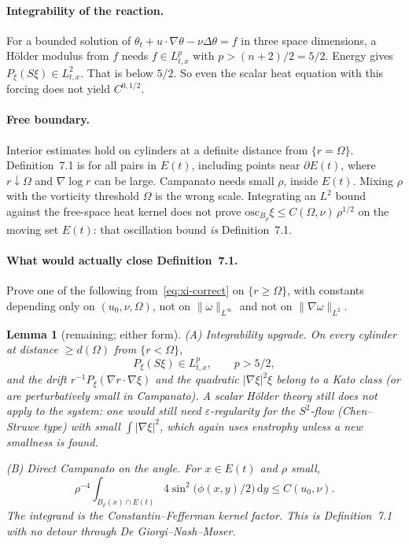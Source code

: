 \documentclass[11pt,a4paper]{article}
\newtheorem{lemma}{Lemma}
\theoremstyle{definition}
\theoremstyle{remark}
\newcommand{\abs}[1]{\lvert#1\rvert}
\newcommand{\norm}[1]{\lVert#1\rVert}
\newcommand{\dd}{\mathrm{d}}
\begin{document}
\paragraph{Integrability of the reaction.}
For a bounded solution of \(\theta_t+u\cdot\nabla\theta-\nu\Delta\theta=f\)
in three space dimensions, a H\"older modulus from \(f\) needs
\(f\in L^p_{t,x}\) with \(p>(n+2)/2=5/2\). Energy gives
\(P_\xi(S\xi)\in L^2_{t,x}\). That is below \(5/2\). So even the scalar
heat equation with this forcing does not yield \(C^{0,1/2}\).

\paragraph{Free boundary.}
Interior estimates hold on cylinders at a definite distance from
\(\{r=\Omega\}\). Definition~7.1 is for all pairs in \(E(t)\), including
points near \(\partial E(t)\), where \(r\downarrow\Omega\) and
\(\nabla\log r\) can be large. Campanato needs small \(\rho\), inside
\(E(t)\). Mixing \(\rho\) with the vorticity threshold \(\Omega\) is
the wrong scale. Integrating an \(L^2\) bound against the free-space
heat kernel does not prove
\(\mathrm{osc}_{B_\rho}\xi\le C(\Omega,\nu)\,\rho^{1/2}\)
on the moving set \(E(t)\): that oscillation bound \emph{is}
Definition~7.1.

\paragraph{What would actually close Definition~7.1.}
Prove one of the following from~\eqref{eq:xi-correct} on \(\{r\ge\Omega\}\),
with constants depending only on \((u_0,\nu,\Omega)\), not on
\(\norm{\omega}_{L^\infty}\) and not on \(\norm{\nabla\omega}_{L^2}\).

\begin{lemma}[remaining; either form]
\label{lem:AB}
\textit{(A) Integrability upgrade.}
On every cylinder at distance \(\ge d(\Omega)\) from \(\{r<\Omega\}\),
\[
P_\xi(S\xi)\in L^p_{t,x},\qquad p>5/2,
\]
and the drift \(r^{-1}P_\xi(\nabla r\cdot\nabla\xi)\) and the quadratic
\(\abs{\nabla\xi}^2\xi\) belong to a Kato class (or are perturbatively
small in Campanato). A scalar H\"older theory still does not apply to
the system: one would still need \(\varepsilon\)-regularity for the
\(S^2\)-flow (Chen--Struwe type) with small \(\int\abs{\nabla\xi}^2\),
which again uses enstrophy unless a new smallness is found.

\textit{(B) Direct Campanato on the angle.}
For \(x\in E(t)\) and \(\rho\) small,
\begin{equation}
\label{eq:campanato-angle}
\rho^{-4}\int_{B_\rho(x)\cap E(t)}
4\sin^2\bigl(\phi(x,y)/2\bigr)\,\dd y
\le C(u_0,\nu).
\end{equation}
The integrand is the Constantin--Fefferman kernel factor. This is
Definition~7.1 with no detour through De Giorgi--Nash--Moser.
\end{lemma}
\end{document}
